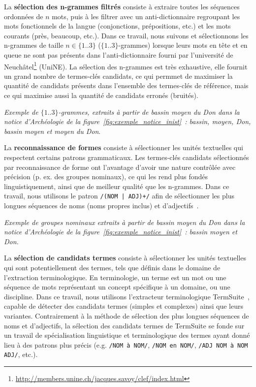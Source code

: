     La \textbf{sélection des n-grammes filtrés} consiste à extraire toutes les
    séquences ordonnées de $n$ mots, puis à les filtrer avec un
    anti-dictionnaire regroupant les mots fonctionnels de la langue
    (conjonctions, prépositions, etc.) et les mots courants (\og{}près\fg{},
    \og{}beaucoup\fg{}, etc.). Dans ce travail, nous suivons
     et sélectionnons les n-grammes de taille $n \in
    \{1..3\}$ ($\{1..3\}$-grammes) lorsque leurs mots en tête et en queue ne
    sont pas présents dans l'anti-dictionnaire fourni par l'université de
    Neuchâtel\footnote{\url{http://members.unine.ch/jacques.savoy/clef/index.html}}
    (UniNE). La sélection des n-grammes est très exhaustive, elle fournit un
    grand nombre de termes-clés candidats, ce qui permmet de maximiser la
    quantité de candidats présents dans l'ensemble des termes-clés de référence,
    mais ce qui maximise aussi la quantité de candidats erronés (bruités).
    
    \textit{Exemple de $\{1..3\}$-grammes, extraits à partir de \og{}bassin
    moyen du Don\fg{} dans la notice d'Archéologie de la
    figure~\ref{fig:exemple_notice_inist}~: \og{}bassin\fg{}, \og{}moyen\fg{},
    \og{}Don\fg{}, \og{}bassin moyen\fg{} et \og{}moyen du Don\fg{}}.

    La \textbf{reconnaissance de formes} consiste à sélectionner les unités
    textuelles qui respectent certains patrons grammaticaux. Les termes-clés
    candidats sélectionnés par reconnaissance de forme ont l'avantage d'avoir
    une nature contrôlée avec précision (p. ex. des groupes nominaux), ce qui
    les rend plus fondés linguistiquement, ainsi que de meilleur qualité que les
    n-grammes. Dans ce travail, nous utilisons le patron \texttt{/(NOM | ADJ)+/}
    afin de sélectionner les plus longues séquences de noms (noms propres
    inclus) et d'adjectifs~\cite{hassan2010conundrums}.
    
    \textit{Exemple de groupes nominaux extraits à partir de \og{}bassin moyen
    du Don\fg{} dans la notice d'Archéologie de la
    figure~\ref{fig:exemple_notice_inist}~: \og{}bassin moyen\fg{} et
    \og{}Don\fg{}.}

    La \textbf{sélection de candidats termes} consiste à sélectionner les unités
    textuelles qui sont potentiellement des termes, tels que définis dans le
    domaine de l'extraction terminologique. En terminologie, un terme est un mot
    ou une séquence de mots représentant un concept spécifique à un domaine, ou
    une discipline. Dans ce travail, nous utilisons l'extracteur terminologique
    TermSuite~\cite{rocheteau2011termsuite}, capable de détecter des candidats
    termes (simples et complexes) ainsi que leurs variantes. Contrairement à la
    méthode de sélection des plus longues séquences de noms et d'adjectifs, la
    sélection des candidats termes de TermSuite se fonde sur un travail de
    spécialisation linguistique et terminologique des termes ayant donné lieu à
    des patrons plus précis (e.g. \texttt{/NOM à NOM/}, \texttt{/NOM en NOM/},
    \texttt{/ADJ NOM à NOM ADJ/}, etc.).
    
